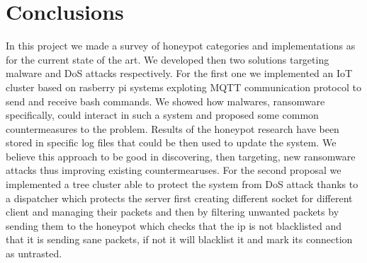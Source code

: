 \chapter{Conclusions}
In this project we made a survey of honeypot categories and implementations as for the current state of the art. We developed then two solutions targeting malware and DoS attacks respectively. For the first one we implemented an IoT cluster based on rasberry pi systems exploting MQTT communication protocol to send and receive bash commands. We showed how malwares, ransomware specifically, could interact in such a system and proposed some common countermeasures to the problem. Results of the honeypot research have been stored in specific log files that could be then used to update the system. We believe this approach to be good in discovering, then targeting, new ransomware attacks thus improving existing countermearuses. For the second proposal we implemented a tree cluster able to protect the system from DoS attack thanks to a dispatcher which protects the server first creating different socket for different client and managing their packets and then by filtering unwanted packets by sending them to the honeypot which checks that the ip is not blacklisted and that it is sending sane packets, if not it will blacklist it and mark its connection as untrasted.
